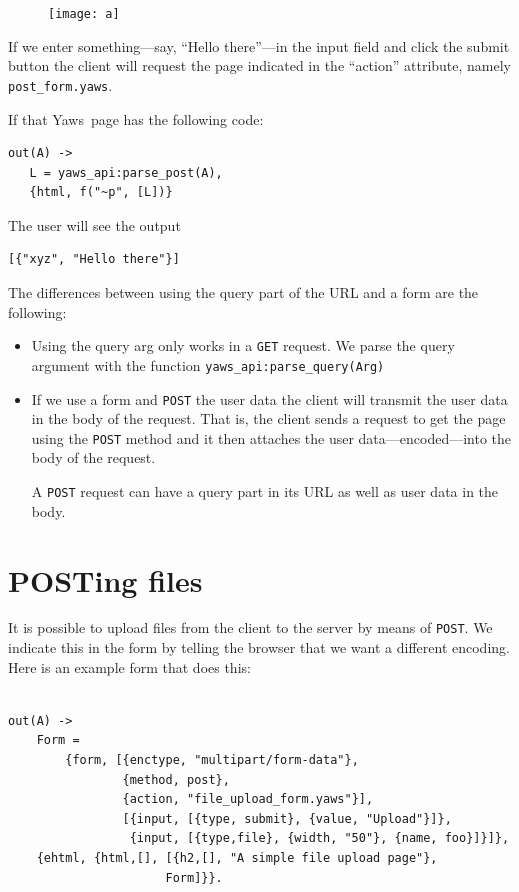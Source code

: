 \documentclass[11pt,oneside,english]{book}
\newcommand{\Yaws}            %
        {{\sc Yaws}}
\begin{document}
\begin{figure}[h]
\begin{center}

 \texttt{[image: a]}

\end{center}
\end{figure}


If we enter something---say, ``Hello there''---in the input field and
click the submit button the client will request the page indicated in
the ``action'' attribute, namely \verb+post_form.yaws+.

If that \Yaws\  page has the following code:

\begin{verbatim}
out(A) ->
   L = yaws_api:parse_post(A),
   {html, f("~p", [L])}
\end{verbatim}

The user will see the output

\begin{verbatim}
[{"xyz", "Hello there"}]
\end{verbatim}

The differences between using the query part of the URL
and a form are the following:

\begin{itemize}
\item Using the query arg only works in a \verb+GET+ request. We parse
  the query argument with the function
  \verb+yaws_api:parse_query(Arg)+

\item If we use a form and \verb+POST+ the user data the client will
  transmit the user data in the body of the request.  That is, the
  client sends a request to get the page using the \verb+POST+ method
  and it then attaches the user data---encoded---into the body of the
  request.

A \verb+POST+ request can have a query part in its URL as well as user
data in the body.
\end{itemize}


\section{POSTing files}

It is possible to upload files from the client to the server by means
of \verb+POST+. We indicate this in the form by telling the browser
that we want a different encoding. Here is an example form that does
this:
\begin{verbatim}

out(A) ->
    Form =
        {form, [{enctype, "multipart/form-data"},
                {method, post},
                {action, "file_upload_form.yaws"}],
                [{input, [{type, submit}, {value, "Upload"}]},
                 {input, [{type,file}, {width, "50"}, {name, foo}]}]},
    {ehtml, {html,[], [{h2,[], "A simple file upload page"},
                      Form]}}.

\end{verbatim}
\end{document}

